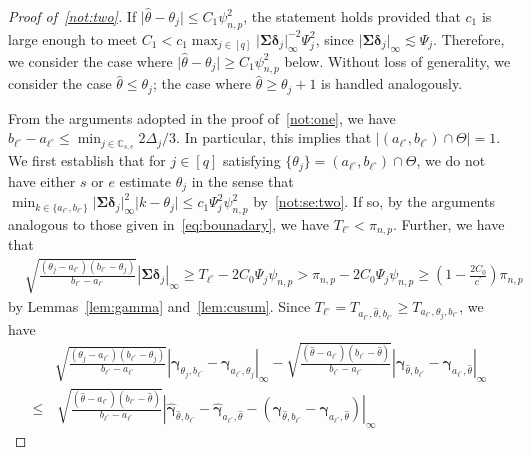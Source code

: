\documentclass[11pt, a4paper]{article}
\renewcommand{\l}{\left}
\renewcommand{\r}{\right}
\def\wh{\widehat}
\newcommand{\cp}{\theta}
\newcommand{\Cp}{\Theta}
\newcommand{\nn}{\nonumber}
\theoremstyle{definition}
\theoremstyle{definition}
\theoremstyle{definition}
\theoremstyle{definition}
\theoremstyle{definition}
\theoremstyle{remark}
\theoremstyle{definition}
\theoremstyle{definition}
\theoremstyle{definition}
\begin{document}
\begin{proof}[Proof of~\ref{not:two}] 
	If $\vert \wh\cp - \cp_j \vert \le C_1 \psi_{n, p}^2$, the statement holds provided that $c_1$ is large enough to meet $C_1 < c_1 \max_{j \in [q]} \vert \bm\Sigma \bm\delta_j \vert_\infty^{-2} \Psi_j^2$, since $ \vert \bm\Sigma \bm\delta_j \vert_\infty \lesssim \Psi_j$. 
	Therefore, we consider the case where $\vert \wh\cp - \cp_j \vert \ge C_1 \psi_{n, p}^2$ below.
	Without loss of generality, we consider the case $\wh\cp \le \cp_j$; the case where $\wh\cp \ge \cp_j + 1$ is handled analogously.
	
	From the arguments adopted in the proof of~\ref{not:one}, we have $b_{\ell^\circ} - a_{\ell^\circ} \le \min_{j \in \mathbb{C}_{s, e}} 2\Delta_j/3$.
	In particular, this implies that $\vert (a_{\ell^\circ}, b_{\ell^\circ}) \cap \Cp \vert = 1$.
	We first establish that for $j \in [q]$ satisfying $\{\cp_j\} = (a_{\ell^\circ}, b_{\ell^\circ}) \cap \Cp$, we do not have either $s$ or $e$ estimate $\cp_j$ in the sense that $\min_{k \in \{a_{\ell^\circ}, b_{\ell^\circ}\}} \vert \bm\Sigma \bm\delta_j \vert_\infty^2 \vert k - \cp_j \vert \le c_1 \Psi_j^2 \psi_{n, p}^2$ by~\ref{not:se:two}. If so, by the arguments analogous to those given in~\eqref{eq:bounadary}, we have $T_{\ell^\circ} < \pi_{n, p}$.
	Further, we have that 
	\begin{align}
	& \sqrt{\frac{(\cp_j - a_{\ell^\circ}) (b_{\ell^\circ} - \cp_j) }{ b_{\ell^\circ} - a_{\ell^\circ} }} \l\vert \bm\Sigma \bm\delta_j \r\vert_\infty 
	\ge T_{\ell^\circ} - 2 C_0 \Psi_j \psi_{n, p} > \pi_{n, p} - 2 C_0 \Psi_j \psi_{n, p} \ge \l( 1 - \frac{2 C_0}{c^\prime} \r) \pi_{n, p} \label{eq:not:min:dist}
	\end{align}
	by Lemmas~\ref{lem:gamma} and~\ref{lem:cusum}.
	Since $T_{\ell^\circ} = T_{a_{\ell^\circ}, \wh\cp, b_{\ell^\circ}} \ge T_{a_{\ell^\circ}, \cp_j, b_{\ell^\circ}}$, we have
	\begin{align}
	& \sqrt{\frac{(\cp_j - a_{\ell^\circ}) (b_{\ell^\circ} - \cp_j) }{ b_{\ell^\circ} - a_{\ell^\circ} }} \l\vert \bm\gamma_{\cp_j, b_{\ell^\circ}} - \bm\gamma_{a_{\ell^\circ}, \cp_j} \r\vert_\infty
	- 
	\sqrt{\frac{(\wh\cp - a_{\ell^\circ}) (b_{\ell^\circ} - \wh\cp) }{ b_{\ell^\circ} - a_{\ell^\circ} }} \l\vert \bm\gamma_{\wh\cp, b_{\ell^\circ}} - \bm\gamma_{a_{\ell^\circ}, \wh\cp} \r\vert_\infty
	\nn \\
	\le & \, 
	\sqrt{\frac{(\wh\cp - a_{\ell^\circ}) (b_{\ell^\circ} - \wh\cp) }{ b_{\ell^\circ} - a_{\ell^\circ} }} \l\vert \wh{\bm\gamma}_{\wh\cp, b_{\ell^\circ}} - \wh{\bm\gamma}_{a_{\ell^\circ}, \wh\cp} - \l( \bm\gamma_{\wh\cp, b_{\ell^\circ}} - \bm\gamma_{a_{\ell^\circ}, \wh\cp} \r) \r\vert_\infty

\end{align}
\end{proof}
\end{document}

